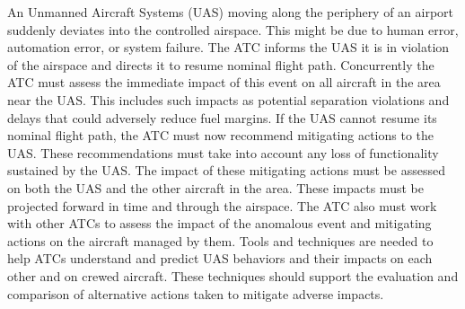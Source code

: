 An Unmanned Aircraft Systems (UAS) moving along the periphery of an
airport suddenly deviates into the controlled airspace.  This might be
due to human error, automation error, or system failure. The ATC
informs the UAS it is in violation of the airspace and directs it to
resume nominal flight path. Concurrently the ATC must assess the
immediate impact of this event on all aircraft in the area near the
UAS. This includes such impacts as potential separation violations and
delays that could adversely reduce fuel margins. If the UAS cannot
resume its nominal flight path, the ATC must now recommend mitigating
actions to the UAS. These recommendations must take into account any
loss of functionality sustained by the UAS. The impact of these
mitigating actions must be assessed on both the UAS and the other
aircraft in the area. These impacts must be projected forward in time
and through the airspace. The ATC also must work with other ATCs to
assess the impact of the anomalous event and mitigating actions on the
aircraft managed by them. Tools and techniques are needed to help ATCs
understand and predict UAS behaviors and their impacts on each other
and on crewed aircraft. These techniques should support the evaluation
and comparison of alternative actions taken to mitigate adverse
impacts.



